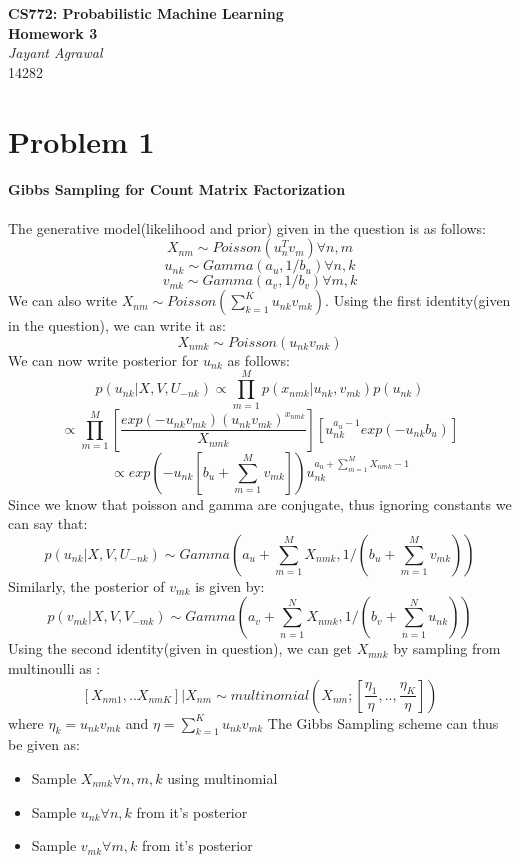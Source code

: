 \documentclass{article}
\begin{document}

\begin{center}
\textbf{\huge CS772: Probabilistic Machine Learning} \\
\textbf{\huge Homework 3} \\
\vspace{5pt}
\textit{\Large Jayant Agrawal} \\
14282
\end{center}

\section*{Problem 1}
\textbf{Gibbs Sampling for Count Matrix Factorization} \\ \\
The generative model(likelihood and prior) given in the question is as follows:
$$X_{nm} \sim Poisson(u_n^Tv_m) \forall n,m $$
$$u_{nk} \sim Gamma(a_u, 1/b_u) \forall n,k $$
$$v_{mk} \sim Gamma(a_v, 1/b_v) \forall m,k $$
We can also write $ X_{nm} \sim Poisson(\sum_{k=1}^K u_{nk}v_{mk}) $. Using the first identity(given in the question), we can write it as:
$$ X_{nmk} \sim Poisson(u_{nk}v_{mk}) $$
We can now write posterior for $u_{nk}$ as follows:
$$p(u_{nk}|X,V,U_{-nk}) \propto \prod_{m=1}^M p(x_{nmk}|u_{nk},v_{mk})p(u_{nk})$$
$$ \propto \prod_{m=1}^M [\frac{exp(-u_{nk}v_{mk})(u_{nk}v_{mk})^{x_{nmk}}}{X_{nmk}}] [u_{nk}^{a_u-1}exp(-u_{nk}b_u)]$$
$$ \propto exp(-u_{nk}[b_u+\sum_{m=1}^Mv_{mk}])u_{nk}^{a_u+\sum_{m=1}^MX_{nmk}-1} $$
Since we know that poisson and gamma are conjugate, thus ignoring constants we can say that:
$$p(u_{nk}|X,V,U_{-nk}) \sim Gamma(a_u+\sum_{m=1}^MX_{nmk}, 1/(b_u+\sum_{m=1}^Mv_{mk}))$$
Similarly, the posterior of $v_{mk}$ is given by:
$$p(v_{mk}|X,V,V_{-mk}) \sim Gamma(a_v+\sum_{n=1}^NX_{nmk}, 1/(b_v+\sum_{n=1}^Nu_{nk}))$$
Using the second identity(given in question), we can get $X_{mnk}$ by sampling from multinoulli as :
$$[X_{nm1},..X_{nmK}]|X_{nm} \sim multinomial(X_{nm};[\frac{\eta_1}{\eta}, ..,\frac{\eta_K}{\eta} ])$$
where $\eta_k = u_{nk}v_{mk}$ and $\eta = \sum_{k=1}^K u_{nk}v_{mk} $
The Gibbs Sampling scheme can thus be given as:
\begin{itemize}
\item Sample $X_{nmk} \forall n,m,k$ using multinomial
\item Sample $u_{nk} \forall n,k$ from it's posterior
\item Sample $v_{mk} \forall m,k$ from it's posterior
\end{itemize}
\end{document}
